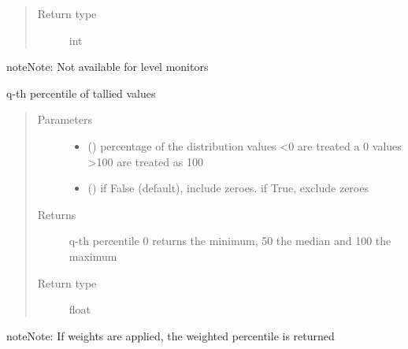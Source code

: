 \documentclass[letterpaper,10pt,english]{sphinxmanual}
\begin{document}
\begin{fulllineitems}
\begin{fulllineitems}
\begin{quote}
\begin{description}
\item[{Return type}] \leavevmode
int

\end{description}\end{quote}

\begin{sphinxadmonition}{note}{Note:}
Not available for level monitors
\end{sphinxadmonition}

\end{fulllineitems}


\begin{fulllineitems}
\label{\detokenize{Reference:salabim.Monitor.percentile}}
q-th percentile of tallied values
\begin{quote}\begin{description}
\item[{Parameters}] \leavevmode\begin{itemize}
\item {} 
 () \textendash{} percentage of the distribution 
values \textless{}0 are treated a 0 
values \textgreater{}100 are treated as 100

\item {} 
 () \textendash{} if False (default), include zeroes. if True, exclude zeroes

\end{itemize}

\item[{Returns}] \leavevmode
q-th percentile 
0 returns the minimum, 50 the median and 100 the maximum

\item[{Return type}] \leavevmode
float

\end{description}\end{quote}

\begin{sphinxadmonition}{note}{Note:}
If weights are applied, the weighted percentile is returned
\end{sphinxadmonition}

\end{fulllineitems}



\end{fulllineitems}
\end{document}
